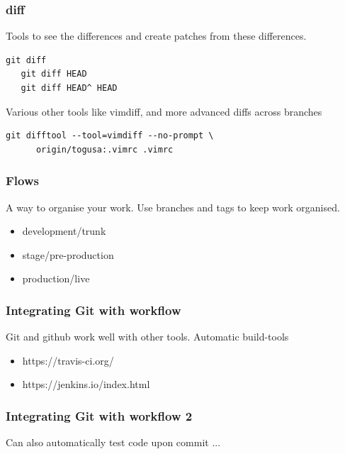\documentclass{beamer}
\begin{document}

\begin{frame}[fragile]
  \frametitle{diff}
  Tools to see the differences and create patches from these differences.

  \begin{lstlisting}[caption=diff examples] 
   git diff
   git diff HEAD
   git diff HEAD^ HEAD
  \end{lstlisting}

  Various other tools like vimdiff, and more advanced diffs across branches

  \begin{lstlisting}[caption=diff examples 2] 
    git difftool --tool=vimdiff --no-prompt \
      origin/togusa:.vimrc .vimrc
  \end{lstlisting}

\end{frame}


\begin{frame}
  \frametitle{Flows}
  A way to organise your work. Use branches and tags to keep work organised. 
 
  \begin{itemize}
    \item development/trunk
    \item stage/pre-production
    \item production/live
  \end{itemize}
 
\end{frame}


\begin{frame}
  \frametitle{Integrating Git with workflow}
  Git and github work well with other tools. Automatic build-tools  

  \begin{itemize} 
    \item https://travis-ci.org/
    \item https://jenkins.io/index.html
  \end{itemize}
 
\end{frame}


\begin{frame}
  \frametitle{Integrating Git with workflow 2}
  Can also automatically test code upon commit ... 

\end{frame}
\end{document}
